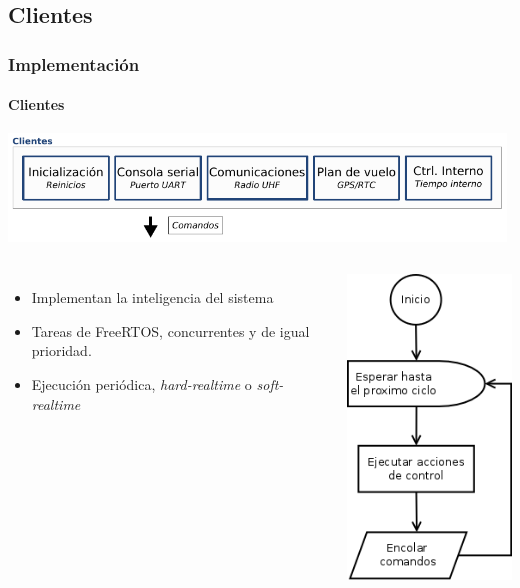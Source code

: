 \documentclass[xcolor=dvipsnames]{beamer}
\begin{document}
    \subsection{Clientes}
    \begin{frame}
        \frametitle{Implementación}
        \framesubtitle{Clientes}
        \begin{center}
            \includegraphics[width=0.99\textwidth]{img/implementacion_clientes.pdf}
        \end{center}
                    
        \begin{columns}
            \column[t]{7cm}
                \begin{itemize}
                    \item Implementan la inteligencia del sistema
                    \item Tareas de FreeRTOS, concurrentes y de igual prioridad.
                    \item Ejecución periódica, \textit{hard-realtime} o \textit{soft-realtime}
                \end{itemize}
            \column[t]{4cm}
                \begin{center}
                    \vspace{-1.5cm}
                    \includegraphics[scale=0.3]{img/listeners-flow.png}
                \end{center}
        \end{columns}
        
    \end{frame}
    
\end{document}
